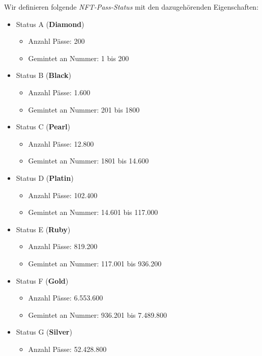 \begin{NFT-Prop}

Wir definieren folgende \textit{NFT-Pass-Status} mit den dazugehörenden Eigenschaften:

\begin{itemize}
    \item Status A (\textbf{Diamond})
    \begin{itemize}
    	\item Anzahl Pässe: 200
    	\item Gemintet an Nummer: 1 bis 200
    \end{itemize}
    \item Status B (\textbf{Black})
    \begin{itemize}
    	\item Anzahl Pässe: 1.600
    	\item Gemintet an Nummer: 201 bis 1800
    \end{itemize}
    \item Status C (\textbf{Pearl})
    \begin{itemize}
    	\item Anzahl Pässe: 12.800
    	\item Gemintet an Nummer: 1801 bis 14.600
    \end{itemize}
    \item Status D (\textbf{Platin})
    \begin{itemize}
    	\item Anzahl Pässe: 102.400
    	\item Gemintet an Nummer: 14.601 bis 117.000
    \end{itemize}
    \item Status E (\textbf{Ruby})
    \begin{itemize}
    	\item Anzahl Pässe: 819.200
    	\item Gemintet an Nummer: 117.001 bis 936.200
    \end{itemize}
    \item Status F (\textbf{Gold})
    \begin{itemize}
    	\item Anzahl Pässe: 6.553.600
    	\item Gemintet an Nummer: 936.201 bis 7.489.800
    \end{itemize}
    \item Status G (\textbf{Silver})
    \begin{itemize}
    	\item Anzahl Pässe: 52.428.800

\end{itemize}
\end{itemize}
\end{NFT-Prop}

